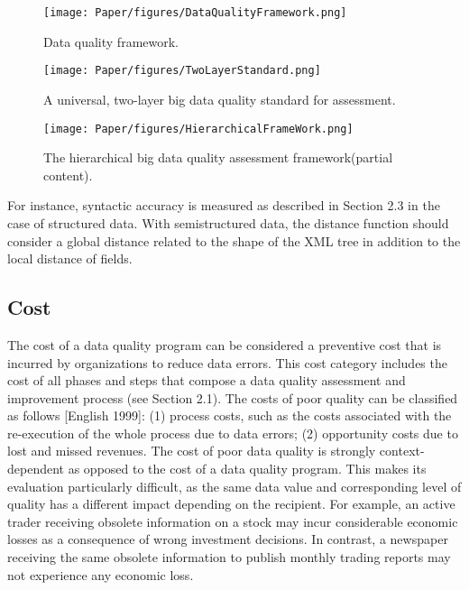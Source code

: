 \documentclass[pdftex,english,oribibl]{llncs}
\begin{document}
  \begin{figure}
    \centering
    \texttt{[image: Paper/figures/DataQualityFramework.png]}
    \caption{Data quality framework.}
    \label{fig:dataqualityframework}
  \end{figure}

  \begin{figure}
    \centering
    \texttt{[image: Paper/figures/TwoLayerStandard.png]}
    \caption{A universal, two-layer big data quality standard for assessment.}
    \label{fig:twolayerstandard}
  \end{figure}

\begin{figure}
    \centering
    \texttt{[image: Paper/figures/HierarchicalFrameWork.png]}
    \caption{The hierarchical big data quality assessment framework(partial content).}
    \label{fig:hierachicalframwork}
 \end{figure}

 For instance, syntactic accuracy is measured as described in Section 2.3 in the case of structured data. With semistructured data, the distance function should consider a global distance related to the shape of the XML tree in addition to the local distance of fields.


\subsection{Cost}
The cost of a data quality program can be considered a preventive cost that is incurred by organizations to reduce data errors. This cost category includes the cost of all phases and steps that compose a data quality assessment and improvement process (see Section 2.1).
 The costs of poor quality can be classified as follows [English 1999]:
 (1) process costs, such as the costs associated with the re-execution of the whole process due to data errors;
 (2) opportunity costs due to lost and missed revenues.
 The cost of poor data quality is strongly context-dependent as opposed to the cost of a data quality program. This makes its evaluation particularly difficult, as the same data value and corresponding level of quality has a different impact depending on the recipient. For example, an active trader receiving obsolete information on a stock may incur considerable economic losses as a consequence of wrong investment decisions. In contrast, a newspaper receiving the same obsolete information to publish monthly trading reports may not experience any economic loss.
\end{document}
